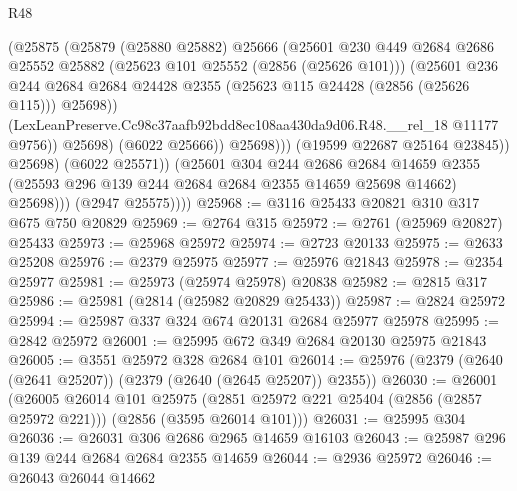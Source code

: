 \begin{lexlean}{R48}
\begin{coremodule}
                            (@25875
                              (@25879
                                (@25880 @25882)
                                @25666
                                (@25601
                                  @230
                                  @449
                                  @2684
                                  @2686
                                  @25552
                                  @25882
                                  (@25623 @101 @25552 (@2856 (@25626 @101)))
                                  (@25601
                                    @236
                                    @244
                                    @2684
                                    @2684
                                    @24428
                                    @2355
                                    (@25623 @115 @24428 (@2856 (@25626 @115)))
                                    @25698))
                                (LexLeanPreserve.Cc98c37aafb92bdd8ec108aa430da9d06.R48.__rel_18
                                  @11177
                                  @9756))
                              @25698)
                            (@6022 @25666))
                          @25698)))
                    (@19599 @22687 @25164 @23845))
                  @25698)
                (@6022 @25571))
              (@25601
                @304
                @244
                @2686
                @2684
                @14659
                @2355
                (@25593 @296 @139 @244 @2684 @2684 @2355 @14659 @25698 @14662)
                @25698)))
          (@2947 @25575))))
@25968 := @3116 @25433 @20821 @310 @317 @675 @750 @20829
@25969 := @2764 @315
@25972 := @2761 (@25969 @20827) @25433
@25973 := @25968 @25972
@25974 := @2723 @20133
@25975 := @2633 @25208
@25976 := @2379 @25975
@25977 := @25976 @21843
@25978 := @2354 @25977
@25981 := @25973 (@25974 @25978) @20838
@25982 := @2815 @317
@25986 := @25981 (@2814 (@25982 @20829 @25433))
@25987 := @2824 @25972
@25994 := @25987 @337 @324 @674 @20131 @2684 @25977 @25978
@25995 := @2842 @25972
@26001 := @25995 @672 @349 @2684 @20130 @25975 @21843
@26005 := @3551 @25972 @328 @2684 @101
@26014 := @25976 (@2379 (@2640 (@2641 @25207)) (@2379 (@2640 (@2645 @25207)) @2355))
@26030 := @26001
    (@26005
      @26014
      @101
      @25975
      (@2851 @25972 @221 @25404 (@2856 (@2857 @25972 @221)))
      (@2856 (@3595 @26014 @101)))
@26031 := @25995 @304
@26036 := @26031 @306 @2686 @2965 @14659 @16103
@26043 := @25987 @296 @139 @244 @2684 @2684 @2355 @14659
@26044 := @2936 @25972
@26046 := @26043 @26044 @14662

\end{coremodule}
\end{lexlean}
